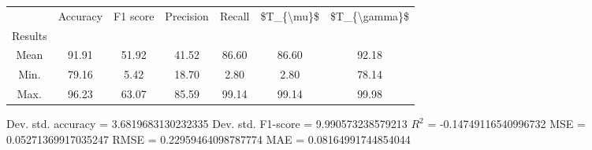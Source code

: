 \begin{tabular}{|c|c|c|c|c|c|c|}
\toprule
{} &  Accuracy &  F1 score &  Precision &  Recall &  \$T\_\{\textbackslash mu\}\$ &  \$T\_\{\textbackslash gamma\}\$ \\
Results &           &           &            &         &            &               \\
\hline
Mean    &     91.91 &     51.92 &      41.52 &   86.60 &      86.60 &         92.18 \\
Min.    &     79.16 &      5.42 &      18.70 &    2.80 &       2.80 &         78.14 \\
Max.    &     96.23 &     63.07 &      85.59 &   99.14 &      99.14 &         99.98 \\
\bottomrule
\end{tabular}

 Dev. std. accuracy = 3.6819683130232335
 Dev. std. F1-score = 9.990573238579213
 $R^2$ = -0.14749116540996732
 MSE = 0.05271369917035247
 RMSE = 0.22959464098787774
 MAE = 0.08164991744854044